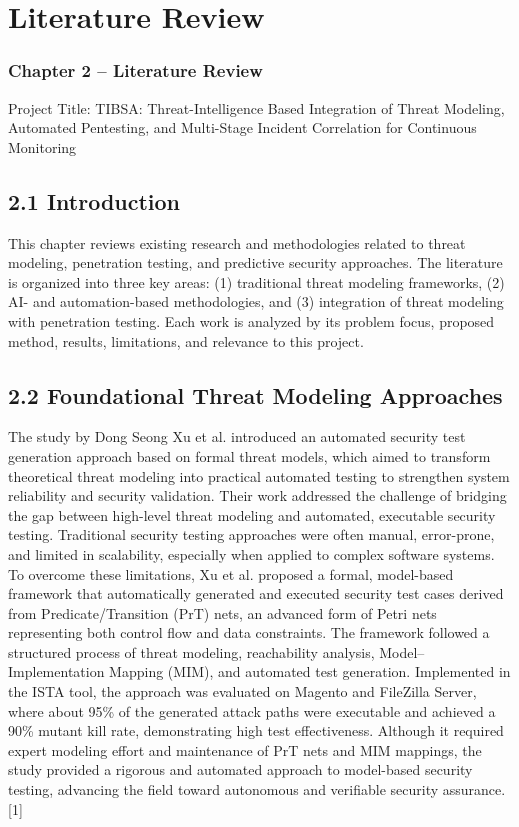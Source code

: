 \documentclass[12pt,a4paper]{report}
\begin{document}
\chapter{Literature Review}
\label{ch:chapter2}

\subsection{Chapter 2 – Literature Review}

Project Title: TIBSA: Threat-Intelligence Based Integration of Threat Modeling, Automated Pentesting, and Multi-Stage Incident Correlation for Continuous Monitoring


\section{2.1 Introduction}

This chapter reviews existing research and methodologies related to threat modeling, penetration testing, and predictive security approaches. The literature is organized into three key areas: (1) traditional threat modeling frameworks, (2) AI- and automation-based methodologies, and (3) integration of threat modeling with penetration testing. Each work is analyzed by its problem focus, proposed method, results, limitations, and relevance to this project.

\section{2.2 Foundational Threat Modeling Approaches}

The study by Dong Seong Xu et al. introduced an automated security test generation approach based on formal threat models, which aimed to transform theoretical threat modeling into practical automated testing to strengthen system reliability and security validation. Their work addressed the challenge of bridging the gap between high-level threat modeling and automated, executable security testing. Traditional security testing approaches were often manual, error-prone, and limited in scalability, especially when applied to complex software systems. To overcome these limitations, Xu et al. proposed a formal, model-based framework that automatically generated and executed security test cases derived from Predicate/Transition (PrT) nets, an advanced form of Petri nets representing both control flow and data constraints. The framework followed a structured process of threat modeling, reachability analysis, Model–Implementation Mapping (MIM), and automated test generation. Implemented in the ISTA tool, the approach was evaluated on Magento and FileZilla Server, where about 95\% of the generated attack paths were executable and achieved a 90\% mutant kill rate, demonstrating high test effectiveness. Although it required expert modeling effort and maintenance of PrT nets and MIM mappings, the study provided a rigorous and automated approach to model-based security testing, advancing the field toward autonomous and verifiable security assurance. [1]
\end{document}
